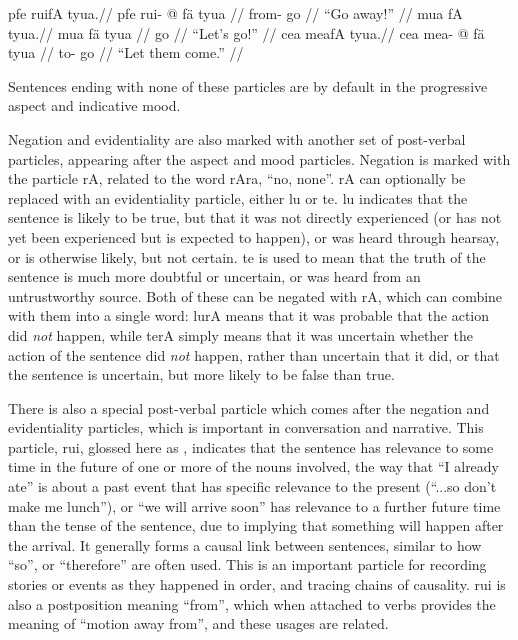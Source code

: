 \documentclass{article}
\begin{document}
\pex[lingstyle=QuCheanya] 
\a
\begingl
\glpreamble pfe ruifA tyua.//
\gla pfe rui- @ f\"a tyua //
\glb {} from- go  //
\glft ``Go away!'' //
\endgl
\a
\begingl
\glpreamble mua fA tyua.//
\gla mua f\"a tyua //
\glb {} go  //
\glft ``Let's go!'' //
\endgl
\a
\begingl
\glpreamble cea meafA tyua.//
\gla cea mea- @ f\"a tyua //
\glb {} to- go  //
\glft ``Let them come.'' //
\endgl
\xe

Sentences ending with none of these particles are by default in the progressive aspect and indicative mood.

Negation and evidentiality are also marked with another set of post-verbal particles, appearing after the aspect and mood particles.  Negation is marked with the particle {\quch rA}, related to the word {\quch rAra}, ``no, none''.  {\quch rA} can optionally be replaced with an evidentiality particle, either {\quch lu} or {\quch te}.  {\quch lu} indicates that the sentence is likely to be true, but that it was not directly experienced (or has not yet been experienced but is expected to happen), or was heard through hearsay, or is otherwise likely, but not certain.  {\quch te} is used to mean that the truth of the sentence is much more doubtful or uncertain, or was heard from an untrustworthy source.  Both of these can be negated with {\quch rA}, which can combine with them into a single word: {\quch lurA} means that it was probable that the action did \emph{not} happen, while {\quch terA} simply means that it was uncertain whether the action of the sentence did \emph{not} happen, rather than uncertain that it did, or that the sentence is uncertain, but more likely to be false than true.

There is also a special post-verbal particle which comes after the negation and evidentiality particles, which is important in conversation and narrative.  This particle, {\quch rui}, glossed here as , indicates that the sentence has relevance to some time in the future of one or more of the nouns involved, the way that ``I already ate'' is about a past event that has specific relevance to the present (``...so don't make me lunch''), or ``we will arrive soon'' has relevance to a further future time than the tense of the sentence, due to implying that something will happen after the arrival.  It generally forms a causal link between sentences, similar to how ``so'', or ``therefore'' are often used.  This is an important particle for recording stories or events as they happened in order, and tracing chains of causality.  {\quch rui} is also a postposition meaning ``from'', which when attached to verbs provides the meaning of ``motion away from'', and these usages are related.
\end{document}
